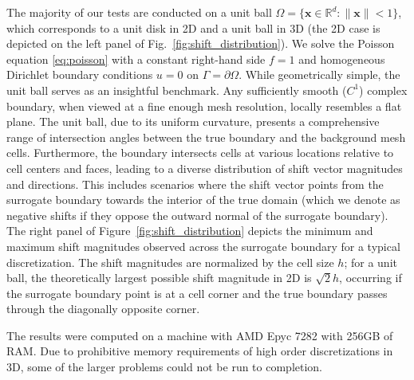 \documentclass{elsarticle}
\begin{document}
The majority of our tests are conducted on a unit ball $\Omega = \{\mathbf{x} \in \mathbb{R}^d : \|\mathbf{x}\| < 1\}$,
which corresponds to a unit disk in 2D and a unit ball in 3D (the 2D case is depicted on the left panel of
Fig.~\ref{fig:shift_distribution}). We solve the Poisson equation \eqref{eq:poisson} with a constant right-hand side
$f=1$ and homogeneous Dirichlet boundary conditions $u=0$ on $\Gamma = \partial\Omega$. While geometrically simple, the
unit ball serves as an insightful benchmark. Any sufficiently smooth ($C^1$) complex boundary, when viewed at a fine
enough mesh resolution, locally resembles a flat plane. The unit ball, due to its uniform curvature, presents a
comprehensive range of intersection angles between the true boundary and the background mesh cells. Furthermore, the
boundary intersects cells at various locations relative to cell centers and faces, leading to a diverse distribution of
shift vector magnitudes and directions. This includes scenarios where the shift vector points from the surrogate
boundary towards the interior of the true domain (which we denote as negative shifts if they oppose the outward normal
of the surrogate boundary). The right panel of Figure~\ref{fig:shift_distribution} depicts the minimum and maximum
shift magnitudes observed across the surrogate boundary for a typical discretization. The shift magnitudes are
normalized by the cell size $h$; for a unit ball, the theoretically largest possible shift magnitude in 2D is
$\sqrt{2}h$, occurring if the surrogate boundary point is at a cell corner and the true boundary passes through the
diagonally opposite corner.

The results were computed on a machine with AMD Epyc 7282 with 256GB of RAM. Due to prohibitive memory requirements of
high order discretizations in 3D, some of the larger problems could not be run to completion.
\end{document}
